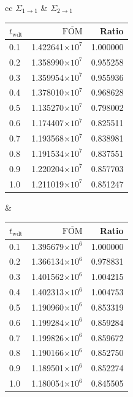 \begin{table}[hbtp]
  \begin{tabular}{cc} $\Sigma_{1\to 1}$ & $\Sigma_{2 \to 1}$ \\
\begin{tabular}{lrr}
\toprule
$t_{\mathrm{wdt}}$ &                   $\overline{\mathrm{FOM}}$ & Ratio\\
\midrule
 0.1 & 1.422641$\times 10^{7}$ & 1.000000 \\
 0.2 & 1.358990$\times 10^{7}$ & 0.955258 \\
 0.3 & 1.359954$\times 10^{7}$ & 0.955936 \\
 0.4 & 1.378010$\times 10^{7}$ & 0.968628 \\
 0.5 & 1.135270$\times 10^{7}$ & 0.798002 \\
 0.6 & 1.174407$\times 10^{7}$ & 0.825511 \\
 0.7 & 1.193568$\times 10^{7}$ & 0.838981 \\
 0.8 & 1.191534$\times 10^{7}$ & 0.837551 \\
 0.9 & 1.220204$\times 10^{7}$ & 0.857703 \\
 1.0 & 1.211019$\times 10^{7}$ & 0.851247 \\
\bottomrule
\end{tabular} &
\begin{tabular}{lrr}
\toprule
$t_{\mathrm{wdt}}$ &                   $\overline{\mathrm{FOM}}$ &
                                                                   Ratio\\
\midrule
 0.1 & 1.395679$\times 10^{6}$ & 1.000000 \\
 0.2 & 1.366134$\times 10^{6}$ & 0.978831 \\
 0.3 & 1.401562$\times 10^{6}$ & 1.004215 \\
 0.4 & 1.402313$\times 10^{6}$ & 1.004753 \\
 0.5 & 1.190960$\times 10^{6}$ & 0.853319 \\
 0.6 & 1.199284$\times 10^{6}$ & 0.859284 \\
 0.7 & 1.199826$\times 10^{6}$ & 0.859672 \\
 0.8 & 1.190166$\times 10^{6}$ & 0.852750 \\
 0.9 & 1.189501$\times 10^{6}$ & 0.852274 \\
 1.0 & 1.180054$\times 10^{6}$ & 0.845505 \\
\bottomrule
\end{tabular} \\


\end{tabular}
\end{table}

